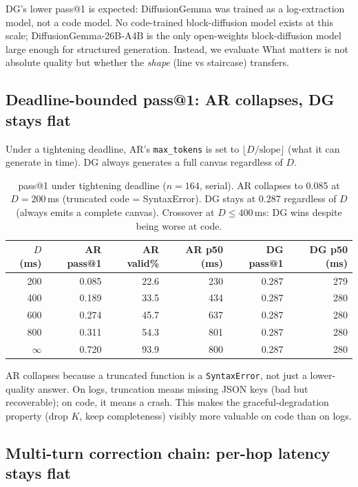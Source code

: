 DG's lower pass@1 is expected: DiffusionGemma was trained as a
log-extraction model, not a code model. No code-trained block-diffusion
model exists at this scale; DiffusionGemma-26B-A4B is the only
open-weights block-diffusion model large enough for structured generation.
Instead, we evaluate
What matters is not absolute quality but whether the \emph{shape}
(line vs staircase) transfers.

\subsection{Deadline-bounded pass@1: AR collapses, DG stays flat}

Under a tightening deadline, AR's \texttt{max\_tokens} is set to
$\lfloor D / \text{slope} \rfloor$ (what it can generate in time).
DG always generates a full canvas regardless of $D$.

\begin{table}[h]
\centering
\caption{pass@1 under tightening deadline ($n{=}164$, serial). AR
collapses to 0.085 at $D{=}200$\,ms (truncated code = SyntaxError).
DG stays at 0.287 regardless of $D$ (always emits a complete canvas).
Crossover at $D \leq 400$\,ms: DG wins despite being worse at code.}
\label{tab:deadline}
\begin{tabular}{@{}rrrrrr@{}}
\toprule
$D$ (ms) & AR pass@1 & AR valid\% & AR p50 (ms) & DG pass@1 & DG p50 (ms) \\
\midrule
200  & 0.085 & 22.6 & 230 & 0.287 & 279 \\
400  & 0.189 & 33.5 & 434 & 0.287 & 280 \\
600  & 0.274 & 45.7 & 637 & 0.287 & 280 \\
800  & 0.311 & 54.3 & 801 & 0.287 & 280 \\
$\infty$ & 0.720 & 93.9 & 800 & 0.287 & 280 \\
\bottomrule
\end{tabular}
\end{table}

AR collapses because a truncated function is a \texttt{SyntaxError},
not just a lower-quality answer. On logs, truncation means missing
JSON keys (bad but recoverable); on code, it means a crash. This makes
the graceful-degradation property (drop $K$, keep completeness)
visibly more valuable on code than on logs.

\subsection{Multi-turn correction chain: per-hop latency stays flat}


